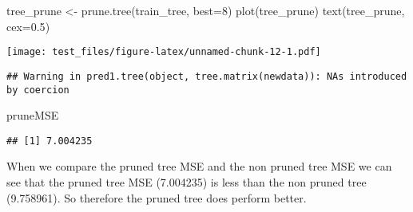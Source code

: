 \documentclass[
]{article}
\newenvironment{Shaded}{\begin{snugshade}}{\end{snugshade}}
\newcommand{\AttributeTok}[1]{\textcolor[rgb]{0.77,0.63,0.00}{#1}}
\newcommand{\DecValTok}[1]{\textcolor[rgb]{0.00,0.00,0.81}{#1}}
\newcommand{\FloatTok}[1]{\textcolor[rgb]{0.00,0.00,0.81}{#1}}
\newcommand{\FunctionTok}[1]{\textcolor[rgb]{0.00,0.00,0.00}{#1}}
\newcommand{\NormalTok}[1]{#1}
\newcommand{\OtherTok}[1]{\textcolor[rgb]{0.56,0.35,0.01}{#1}}
\newcommand{\SpecialCharTok}[1]{\textcolor[rgb]{0.00,0.00,0.00}{#1}}
\begin{document}
\begin{Shaded}
\begin{Highlighting}[]
\NormalTok{tree\_prune }\OtherTok{\textless{}{-}} \FunctionTok{prune.tree}\NormalTok{(train\_tree, }\AttributeTok{best=}\DecValTok{8}\NormalTok{)}
\FunctionTok{plot}\NormalTok{(tree\_prune)}
\FunctionTok{text}\NormalTok{(tree\_prune,}
     \AttributeTok{cex=}\FloatTok{0.5}\NormalTok{)}
\end{Highlighting}
\end{Shaded}

\texttt{[image: test\_files/figure-latex/unnamed-chunk-12-1.pdf]}

\begin{Shaded}
\end{Shaded}

\begin{verbatim}
## Warning in pred1.tree(object, tree.matrix(newdata)): NAs introduced by coercion
\end{verbatim}

\begin{Shaded}
\begin{Highlighting}[]
\NormalTok{pruneMSE}
\end{Highlighting}
\end{Shaded}

\begin{verbatim}
## [1] 7.004235
\end{verbatim}

When we compare the pruned tree MSE and the non pruned tree MSE we can
see that the pruned tree MSE (7.004235) is less than the non pruned tree
(9.758961). So therefore the pruned tree does perform better.
\end{document}
